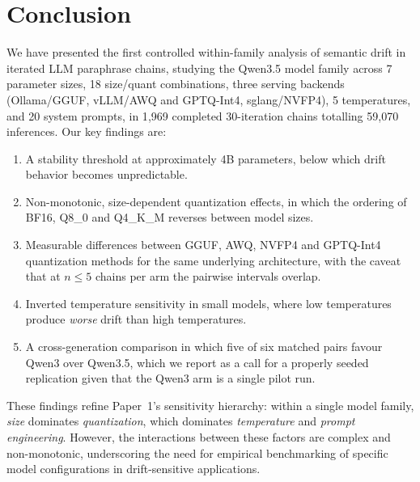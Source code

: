\documentclass[11pt]{article}
\begin{document}
\section{Conclusion}
\label{sec:conclusion}

We have presented the first controlled within-family analysis of semantic
drift in iterated LLM paraphrase chains, studying the Qwen3.5 model family
across 7 parameter sizes, 18 size/quant combinations, three serving
backends (Ollama/GGUF, vLLM/AWQ and GPTQ-Int4, sglang/NVFP4), 5
temperatures, and 20 system prompts, in 1{,}969 completed 30-iteration
chains totalling 59{,}070 inferences. Our key findings are:

\begin{enumerate}[leftmargin=*]
  \item A stability threshold at approximately 4B parameters, below which
        drift behavior becomes unpredictable.
  \item Non-monotonic, size-dependent quantization effects, in which the
        ordering of BF16, Q8\_0 and Q4\_K\_M reverses between model sizes.
  \item Measurable differences between GGUF, AWQ, NVFP4 and GPTQ-Int4
        quantization methods for the same underlying architecture, with the
        caveat that at $n\leq5$ chains per arm the pairwise intervals
        overlap.
  \item Inverted temperature sensitivity in small models, where low
        temperatures produce \emph{worse} drift than high temperatures.
  \item A cross-generation comparison in which five of six matched pairs
        favour Qwen3 over Qwen3.5, which we report as a call for a properly
        seeded replication given that the Qwen3 arm is a single pilot run.
\end{enumerate}

These findings refine Paper~1's sensitivity hierarchy: within a single
model family, \emph{size} dominates \emph{quantization}, which dominates
\emph{temperature} and \emph{prompt engineering}. However, the interactions
between these factors are complex and non-monotonic, underscoring the need
for empirical benchmarking of specific model configurations in
drift-sensitive applications.



\end{document}
